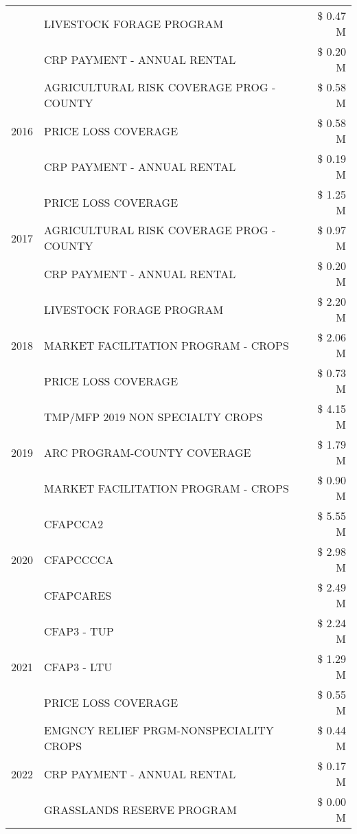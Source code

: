 \begin{tabular}{llr}
 & LIVESTOCK FORAGE PROGRAM & \$ 0.47 M \\
 & CRP PAYMENT - ANNUAL RENTAL & \$ 0.20 M \\
\cline{1-3}
\multirow[t]{3}{*}{2016} & AGRICULTURAL RISK COVERAGE PROG - COUNTY & \$ 0.58 M \\
 & PRICE LOSS COVERAGE & \$ 0.58 M \\
 & CRP PAYMENT - ANNUAL RENTAL & \$ 0.19 M \\
\cline{1-3}
\multirow[t]{3}{*}{2017} & PRICE LOSS COVERAGE & \$ 1.25 M \\
 & AGRICULTURAL RISK COVERAGE PROG - COUNTY & \$ 0.97 M \\
 & CRP PAYMENT - ANNUAL RENTAL & \$ 0.20 M \\
\cline{1-3}
\multirow[t]{3}{*}{2018} & LIVESTOCK FORAGE PROGRAM & \$ 2.20 M \\
 & MARKET FACILITATION PROGRAM - CROPS & \$ 2.06 M \\
 & PRICE LOSS COVERAGE & \$ 0.73 M \\
\cline{1-3}
\multirow[t]{3}{*}{2019} & TMP/MFP 2019 NON SPECIALTY CROPS & \$ 4.15 M \\
 & ARC PROGRAM-COUNTY COVERAGE & \$ 1.79 M \\
 & MARKET FACILITATION PROGRAM - CROPS & \$ 0.90 M \\
\cline{1-3}
\multirow[t]{3}{*}{2020} & CFAPCCA2 & \$ 5.55 M \\
 & CFAPCCCCA & \$ 2.98 M \\
 & CFAPCARES & \$ 2.49 M \\
\cline{1-3}
\multirow[t]{3}{*}{2021} & CFAP3 - TUP & \$ 2.24 M \\
 & CFAP3 - LTU & \$ 1.29 M \\
 & PRICE LOSS COVERAGE & \$ 0.55 M \\
\cline{1-3}
\multirow[t]{3}{*}{2022} & EMGNCY RELIEF PRGM-NONSPECIALITY CROPS & \$ 0.44 M \\
 & CRP PAYMENT - ANNUAL RENTAL & \$ 0.17 M \\
 & GRASSLANDS RESERVE PROGRAM & \$ 0.00 M \\
\cline{1-3}
\bottomrule
\end{tabular}
